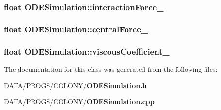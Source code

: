 \subsubsection{\setlength{\rightskip}{0pt plus 5cm}float {\bf ODESimulation::interactionForce\_\-}\hspace{0.3cm}{\tt  [private]}}\label{classODESimulation_d34d25415e06ef21c4a8150d63b5a1df}


\subsubsection{\setlength{\rightskip}{0pt plus 5cm}float {\bf ODESimulation::centralForce\_\-}\hspace{0.3cm}{\tt  [private]}}\label{classODESimulation_56cf02737b0b518f2291022e7bae0d7c}


\subsubsection{\setlength{\rightskip}{0pt plus 5cm}float {\bf ODESimulation::viscousCoefficient\_\-}\hspace{0.3cm}{\tt  [private]}}\label{classODESimulation_10add1a26d4df68d0bd3749243d9321a}




The documentation for this class was generated from the following files:\begin{CompactItemize}
\item 
DATA/PROGS/COLONY/{\bf ODESimulation.h}\item 
DATA/PROGS/COLONY/{\bf ODESimulation.cpp}\end{CompactItemize}
